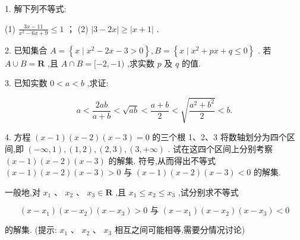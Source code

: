 \documentclass[a4paper,10pt,oneside,fontset=none]{ctexbook}
\renewcommand{\geq}{\geqslant}
\renewcommand{\leq}{\leqslant}
\numberwithin{equation}{chapter}
\begin{document}
1. 解下列不等式:

(1) $\frac{{3x} - {11}}{{x}^{2} - {6x} + 9} \leq  1$ ； (2) $\left| {3 - {2x}}\right|  \geq  \left| {x + 1}\right|$ .

2. 已知集合 $A = \left\{  {x \mid  {x}^{2} - {2x} - 3 > 0}\right\}  , B = \left\{  {x \mid  {x}^{2} + {px} + q \leq  0}\right\}$ . 若 $A \cup  B = \mathbf{R}$ ,且 $A \cap  B = \lbrack  - 2, - 1)$ ,求实数 $p$ 及 $q$ 的值.

3. 已知实数 $0 < a < b$ ,求证:

$$
a < \frac{2ab}{a + b} < \sqrt{ab} < \frac{a + b}{2} < \sqrt{\frac{{a}^{2} + {b}^{2}}{2}} < b.
$$

4. 方程 $\left( {x - 1}\right) \left( {x - 2}\right) \left( {x - 3}\right)  = 0$ 的三个根 1、2、3 将数轴划分为四个区间,即 $\left( {-\infty ,1}\right) ,\left( {1,2}\right) ,\left( {2,3}\right) ,\left( {3, + \infty }\right)$ . 试在这四个区间上分别考察 $\left( {x - 1}\right) \left( {x - 2}\right) \left( {x - 3}\right)$ 的解集. 符号,从而得出不等式 $\left( {x - 1}\right) \left( {x - 2}\right) \left( {x - 3}\right)  > 0$ 与 $\left( {x - 1}\right) \left( {x - 2}\right) \left( {x - 3}\right)  < 0$ 的解集.

一般地,对 ${x}_{1}\text{ 、 }{x}_{2}\text{ 、 }{x}_{3} \in  \mathbf{R}$ ,且 ${x}_{1} \leq  {x}_{2} \leq  {x}_{3}$ ,试分别求不等式

$$
\left( {x - {x}_{1}}\right) \left( {x - {x}_{2}}\right) \left( {x - {x}_{3}}\right)  > 0\text{ 与 }\left( {x - {x}_{1}}\right) \left( {x - {x}_{2}}\right) \left( {x - {x}_{3}}\right)  < 0
$$

的解集. (提示: ${x}_{1}\text{ 、 }{x}_{2}\text{ 、 }{x}_{3}$ 相互之间可能相等,需要分情况讨论)
\end{document}
